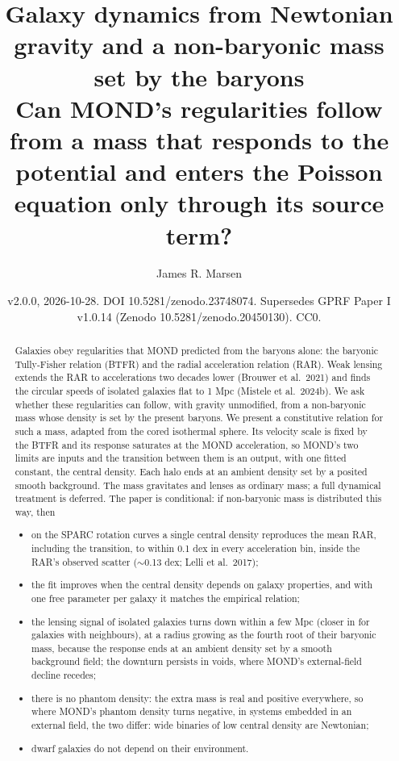 \documentclass[
  10pt,
]{article}
\title{Galaxy dynamics from Newtonian gravity and a non-baryonic mass
set by the baryons\\[0.6ex]{\large Can MOND's regularities follow from a mass that responds to the potential and enters the Poisson equation only through its source term?}}
\author{James R. Marsen}
\date{v2.0.0, 2026-10-28. DOI 10.5281/zenodo.23748074. Supersedes GPRF Paper I v1.0.14 (Zenodo 10.5281/zenodo.20450130). CC0.}
\begin{document}
\maketitle

\begin{abstract}
Galaxies obey regularities that MOND predicted from the baryons alone: the
baryonic Tully-Fisher relation (BTFR) and the radial acceleration relation
(RAR). Weak lensing extends the RAR to accelerations two decades lower
(Brouwer et al.~2021) and finds the circular speeds of isolated galaxies
flat to 1 Mpc (Mistele et al.~2024b). We ask whether these regularities
can follow, with gravity unmodified, from a non-baryonic mass whose
density is set by the present baryons. We present a constitutive relation
for such a mass, adapted from the cored isothermal sphere. Its velocity
scale is fixed by the BTFR and its response saturates at the MOND
acceleration, so MOND's two limits are inputs and the transition between
them is an output, with one fitted constant, the central density. Each halo ends at an ambient density set by a posited smooth background. The
mass gravitates and lenses as ordinary mass; a full dynamical treatment
is deferred. The paper is conditional: if non-baryonic mass is
distributed this way, then
\begin{itemize}
\item[(i)] on the SPARC rotation curves a single central density reproduces the mean RAR, including the transition, to within 0.1 dex in every acceleration bin, inside the RAR's observed scatter ($\sim$0.13 dex; Lelli et al.~2017);
\item[(ii)] the fit improves when the central density depends on galaxy properties, and with one free parameter per galaxy it matches the empirical relation;
\item[(iii)] the lensing signal of isolated galaxies turns down within a few Mpc (closer in for galaxies with neighbours), at a radius growing as the fourth root of their baryonic mass, because the response ends at an ambient density set by a smooth background field; the downturn persists in voids, where MOND's external-field decline recedes;
\item[(iv)] there is no phantom density: the extra mass is real and positive everywhere, so where MOND's phantom density turns negative, in systems embedded in an external field, the two differ: wide binaries of low central density are Newtonian;
\item[(v)] dwarf galaxies do not depend on their environment.
\end{itemize}

\end{abstract}
\end{document}
